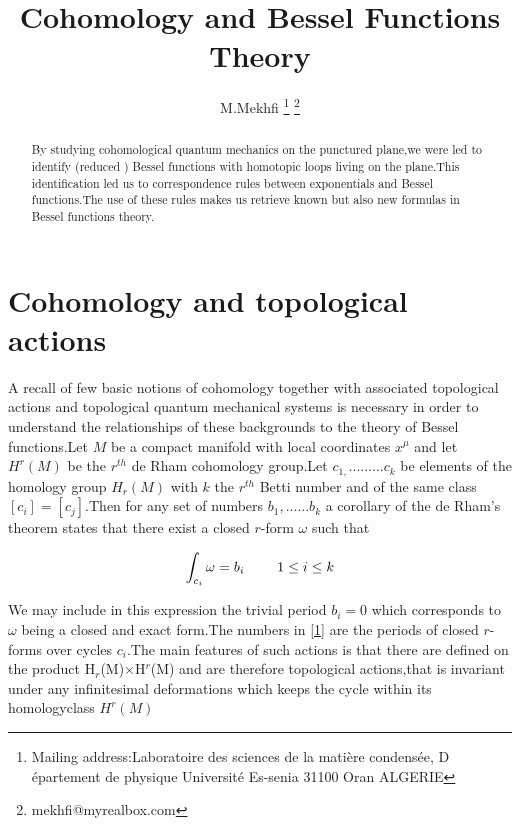 \documentclass[a4paper,11pt]{article}
\begin{document}
\author{M.Mekhfi \thanks{%
Mailing address:Laboratoire des sciences de la mati\`{e}re condens\'{e}e, D%
\'{e}partement de physique {}Universit\'{e} Es-senia 31100 Oran ALGERIE} 
\thanks{{\footnotesize mekhfi@myrealbox.com}}}
\title{Cohomology and Bessel Functions Theory}
\maketitle

\begin{abstract}
By studying cohomological quantum mechanics on the punctured plane,we were
led to identify (reduced ) Bessel functions with homotopic loops living on
the plane.This identification led us to correspondence rules between
exponentials and Bessel functions.The use of these rules makes us retrieve
known but also new formulas in Bessel functions theory.
\end{abstract}

\section{Cohomology and topological actions}

A recall of few basic notions of cohomology together with associated
topological actions and topological quantum mechanical systems is necessary
in order to understand the relationships of these backgrounds to the theory
of Bessel functions.Let $M$ be a compact manifold with local coordinates $%
x^{\mu }$ and let $H^{r}(M)$ be the $r^{th}$ de Rham cohomology group.Let $%
c_{1,}.........c_{k}$ be elements of the homology group $H_{r}(M)$ with $k$
the $r^{th}$ Betti number and of the same class $[c_{i}]=[c_{j}].$Then for
any set of numbers $b_{1},......b_{k}$ a corollary of the de Rham's theorem
states that there exist a closed $r$-form $\omega $ such that

\begin{equation}
\int_{c_{i}}\omega =b_{i} \textrm{ \qquad }1\leq i\leq k  \label{1}
\end{equation}

We may include in this expression the trivial period $b_{i}=0$ which
corresponds to $\omega $ being a closed and exact form.The numbers in \ref{1}
are the periods of closed $r$-forms over cycles $c_{i}.$The main features of
such actions is that there are defined on the product H$_{r}$(M)$\times $H$%
^{r}$(M) and are therefore topological actions,that is invariant under any
infinitesimal deformations which keeps the cycle within its homologyclass $%
H^{r}(M)$
\end{document}
